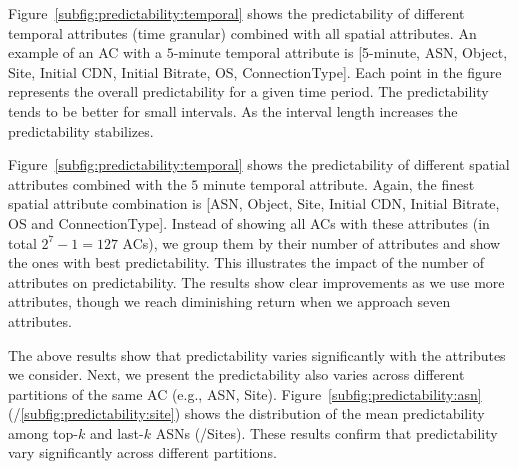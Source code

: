 
 Figure~\ref{subfig:predictability:temporal} shows the predictability of different temporal attributes (time granular) combined with all spatial attributes. An example of an AC with a $5$-minute temporal attribute is [5-minute, ASN, Object, Site, Initial CDN, Initial Bitrate, OS, ConnectionType]. Each point in the figure represents the overall predictability for a given time period. The predictability tends to be better for small intervals. As the interval length increases the predictability stabilizes.

 Figure~\ref{subfig:predictability:temporal} shows the predictability of different spatial attributes combined with the $5$ minute temporal attribute. Again, the finest spatial attribute combination is [ASN, Object, Site, Initial CDN, Initial Bitrate, OS and ConnectionType].  Instead of showing all ACs with these attributes (in total $2^7-1=127$ ACs), we group them by their number of attributes and show the ones with best predictability. This illustrates the impact of the number of attributes on predictability. The results show clear improvements as we use more attributes, though we reach diminishing return when we approach seven attributes.

 The above results show that predictability varies significantly with the attributes we consider. Next, we present the predictability also varies across different partitions of the same AC (e.g., ASN, Site). Figure~\ref{subfig:predictability:asn} (/\ref{subfig:predictability:site}) shows the distribution of the mean predictability among top-$k$ and last-$k$ ASNs (/Sites). These results confirm that predictability vary significantly across different partitions. 

